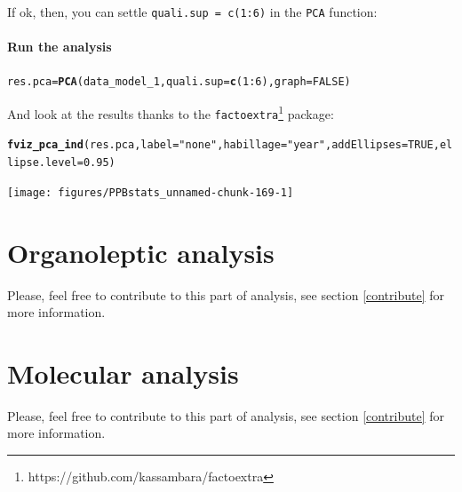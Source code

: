 \documentclass{book}\usepackage[]{graphicx}\usepackage[]{color}
\makeatletter
\newcommand{\hlnum}[1]{\textcolor[rgb]{0.686,0.059,0.569}{#1}}%
\newcommand{\hlstr}[1]{\textcolor[rgb]{0.192,0.494,0.8}{#1}}%
\newcommand{\hlopt}[1]{\textcolor[rgb]{0,0,0}{#1}}%
\newcommand{\hlstd}[1]{\textcolor[rgb]{0.345,0.345,0.345}{#1}}%
\newcommand{\hlkwb}[1]{\textcolor[rgb]{0.69,0.353,0.396}{#1}}%
\newcommand{\hlkwc}[1]{\textcolor[rgb]{0.333,0.667,0.333}{#1}}%
\newcommand{\hlkwd}[1]{\textcolor[rgb]{0.737,0.353,0.396}{\textbf{#1}}}%
\newenvironment{kframe}{%
 \def\at@end@of@kframe{}%
 \ifinner\ifhmode%
  \def\at@end@of@kframe{\end{minipage}}%
  \begin{minipage}{\columnwidth}%
 \fi\fi%
 \def\FrameCommand##1{\hskip\@totalleftmargin \hskip-\fboxsep
 \colorbox{shadecolor}{##1}\hskip-\fboxsep
     \hskip-\linewidth \hskip-\@totalleftmargin \hskip\columnwidth}%
 \MakeFramed {\advance\hsize-\width
   \@totalleftmargin\z@ \linewidth\hsize
   \@setminipage}}%
 {\par\unskip\endMakeFramed%
 \at@end@of@kframe}
\newenvironment{knitrout}{}{} %
\makeatother
\begin{document}
If ok, then, you can settle \texttt{quali.sup = c(1:6)} in the \texttt{PCA} function:

\subsubsection{Run the analysis}


\begin{knitrout}
\color{fgcolor}\begin{kframe}
\begin{alltt}
\hlstd{res.pca} \hlkwb{=} \hlkwd{PCA}\hlstd{(data_model_1,} \hlkwc{quali.sup} \hlstd{=} \hlkwd{c}\hlstd{(}\hlnum{1}\hlopt{:}\hlnum{6}\hlstd{),} \hlkwc{graph} \hlstd{=} \hlnum{FALSE}\hlstd{)}
\end{alltt}
\end{kframe}
\end{knitrout}

And look at the results thanks to the \texttt{factoextra}\footnote{https://github.com/kassambara/factoextra} package:

\begin{knitrout}
\color{fgcolor}\begin{kframe}
\begin{alltt}
\hlkwd{fviz_pca_ind}\hlstd{(res.pca,} \hlkwc{label}\hlstd{=}\hlstr{"none"}\hlstd{,} \hlkwc{habillage}\hlstd{=}\hlstr{"year"}\hlstd{,} \hlkwc{addEllipses}\hlstd{=}\hlnum{TRUE}\hlstd{,} \hlkwc{ellipse.level}\hlstd{=}\hlnum{0.95}\hlstd{)}
\end{alltt}
\end{kframe}

{\centering \texttt{[image: figures/PPBstats\_unnamed-chunk-169-1]} 

}



\end{knitrout}

\newpage

\chapter{Organoleptic analysis}
\label{organoleptic}
Please, feel free to contribute to this part of analysis, see section \ref{contribute} for more information.

\chapter{Molecular analysis}
\label{molecular}
Please, feel free to contribute to this part of analysis, see section \ref{contribute} for more information.
\end{document}
